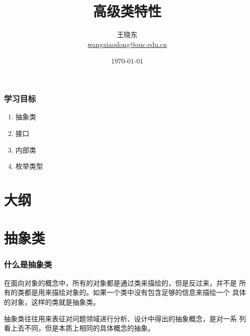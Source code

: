 
\title[Wang Xiaodong]{\\  
  高级类特性}
\author[王晓东]{王晓东\\
  \href{mailto:wangxiaodong@ouc.edu.cn}{\footnotesize wangxiaodong@ouc.edu.cn}}
\date{\today}


\frame{\titlepage}
\begin{frame}
  \frametitle{学习目标}
  \begin{enumerate}
  \item 抽象类
  \item 接口
  \item 内部类
  \item 枚举类型
  \end{enumerate}
\end{frame}
\section*{大纲}
\section{抽象类}

\begin{frame}[fragile]
  \frametitle{什么是抽象类}

  
  在面向对象的概念中，所有的对象都是通过类来描绘的，但是反过来，并不是
  所有的类都是用来描绘对象的。如果一个类中没有包含足够的信息来描绘一个
  具体的对象，这样的类就是抽象类。

  抽象类往往用来表征对问题领域进行分析、设计中得出的抽象概念，是对一系
  列看上去不同，但是本质上相同的具体概念的抽象。
\end{frame}



